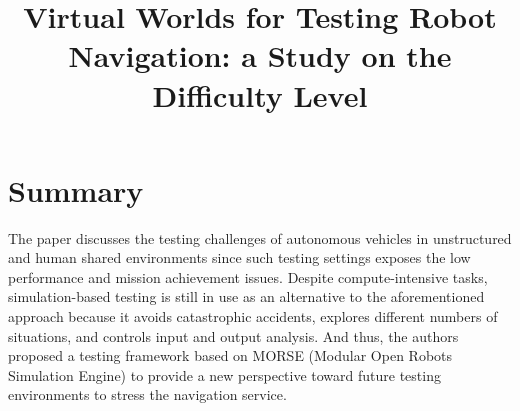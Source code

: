 \documentclass[10pt,a4paper]{report}
\title{Virtual Worlds for Testing Robot Navigation: a Study on the Difficulty Level}
\begin{document}
\begin{center}
\textbf{\thetitle}
\end{center}


\section{Summary}
The paper discusses the testing challenges of autonomous vehicles in unstructured and human shared environments since such testing settings exposes the low performance and mission achievement issues. 
%
Despite compute-intensive tasks, simulation-based testing is still in use as an alternative to the aforementioned approach because it avoids catastrophic accidents, explores different numbers of situations, and controls input and output analysis.
%
And thus, the authors proposed a testing framework based on MORSE (Modular Open Robots Simulation Engine) to provide a new perspective toward future testing environments to stress the navigation service.
%
\end{document}
